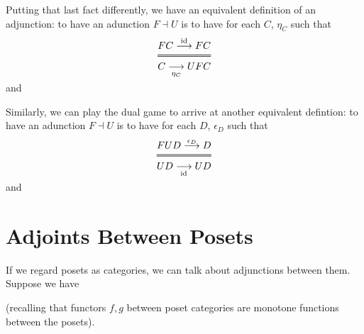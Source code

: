 \begin{definition}
Putting that last fact differently, we have an equivalent definition of an
adjunction: to have an adunction $F \dashv U$ is to have for each $C$, $\eta_C$ such that
\begin{equation*}
  \Efrac{FC \overset{\id{}}\longrightarrow FC}
  {C \underset{\eta_C}\longrightarrow UFC}
\end{equation*} 
and
\begin{center}
\end{center}
\end{definition}

\begin{definition}
Similarly, we can play the dual game to arrive at another equivalent defintion:
to have an adunction $F \dashv U$ is to have for each $D$, $\epsilon_D$ such that
\begin{equation*}
  \Efrac{FUD \overset{\epsilon_D}\longrightarrow D}
  {UD \underset{\id{}}\longrightarrow UD}
\end{equation*} 
and
\begin{center}
\end{center}
\end{definition}

\section{Adjoints Between Posets}

If we regard posets as categories, we can talk about adjunctions between them.
Suppose we have
\begin{center}
\end{center}
(recalling that functors $f,g$ between poset categories are monotone functions
between the posets).

